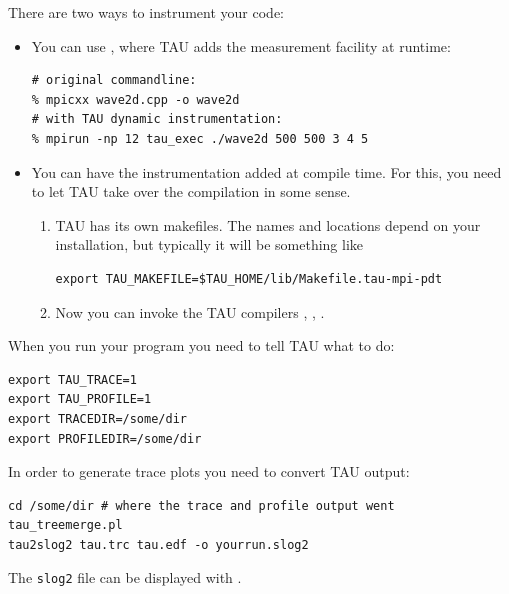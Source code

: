 There are two ways to instrument your code:
\begin{itemize}
\item You can use , where TAU adds the measurement facility at runtime:
\begin{verbatim}
# original commandline:
% mpicxx wave2d.cpp -o wave2d
# with TAU dynamic instrumentation:
% mpirun -np 12 tau_exec ./wave2d 500 500 3 4 5
\end{verbatim}
\item You can have the instrumentation added at compile time. For
  this, you need to let TAU take over the compilation in some sense.
  \begin{enumerate}
  \item TAU has its own makefiles. The names and locations depend on
    your installation, but typically it will be something like
\begin{verbatim}
export TAU_MAKEFILE=$TAU_HOME/lib/Makefile.tau-mpi-pdt
\end{verbatim}
  \item Now you can invoke the TAU compilers , , .
  \end{enumerate}
\end{itemize}

When you run your program you need to tell TAU what to do:
\begin{verbatim}
export TAU_TRACE=1
export TAU_PROFILE=1
export TRACEDIR=/some/dir
export PROFILEDIR=/some/dir
\end{verbatim}

In order to generate trace plots you need to convert TAU output:
\begin{verbatim}
cd /some/dir # where the trace and profile output went
tau_treemerge.pl
tau2slog2 tau.trc tau.edf -o yourrun.slog2
\end{verbatim}

The \texttt{slog2} file can be displayed with .


